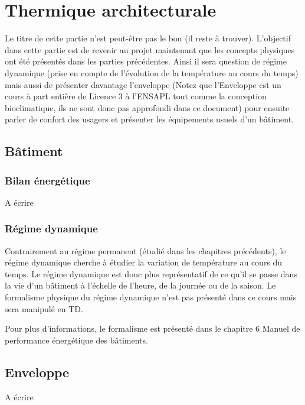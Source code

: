 \part{Thermique architecturale}
Le titre de cette partie n'est peut-être pas le bon (il reste à trouver). L'objectif dans cette partie est de revenir au projet maintenant que les concepts physiques ont été présentés dans les parties précédentes. Ainsi il sera question de régime dynamique (prise en compte de l'évolution de la température au cours du temps) mais aussi de présenter davantage l'enveloppe (Notez que l'Enveloppe est un cours à part entière de Licence 3 à l'ENSAPL tout comme la conception bioclimatique, ils ne sont donc pas approfondi dans ce document) pour ensuite parler de confort des usagers et présenter les équipements usuels d'un bâtiment.

\chapter{Bâtiment}
\section{Bilan énergétique}
A écrire
\section{Régime dynamique}
Contrairement au régime permanent (étudié dans les chapitres précédents), le régime dynamique cherche à étudier la variation de température au cours du temps. Le régime dynamique est donc plus représentatif de ce qu'il se passe dans la vie d'un bâtiment à l’échelle de l'heure, de la journée ou de la saison.
Le formalisme physique du régime dynamique n'est pas présenté dans ce cours mais sera manipulé en TD.

Pour plus d'informations, le formalisme est présenté dans le chapitre 6 Manuel de performance énergétique des bâtiments.

\chapter{Enveloppe}
A écrire

